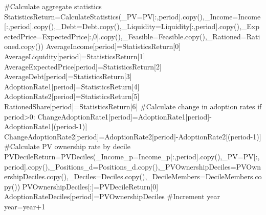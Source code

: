 \documentclass[
  letterpaper,
  DIV=11,
  numbers=noendperiod]{scrartcl}
\newenvironment{Shaded}{\begin{snugshade}}{\end{snugshade}}
\newcommand{\CommentTok}[1]{\textcolor[rgb]{0.37,0.37,0.37}{#1}}
\newcommand{\ControlFlowTok}[1]{\textcolor[rgb]{0.00,0.23,0.31}{#1}}
\newcommand{\DecValTok}[1]{\textcolor[rgb]{0.68,0.00,0.00}{#1}}
\newcommand{\NormalTok}[1]{\textcolor[rgb]{0.00,0.23,0.31}{#1}}
\newcommand{\OperatorTok}[1]{\textcolor[rgb]{0.37,0.37,0.37}{#1}}
\begin{document}
\begin{Shaded}
\begin{Highlighting}[]
        \CommentTok{\#Calculate aggregate statistics}
\NormalTok{        StatisticsReturn}\OperatorTok{=}\NormalTok{CalculateStatistics(\_PV}\OperatorTok{=}\NormalTok{PV[:,period].copy(),\_Income}\OperatorTok{=}\NormalTok{Income[:,period].copy(),\_Debt}\OperatorTok{=}\NormalTok{Debt.copy(),\_Liquidity}\OperatorTok{=}\NormalTok{Liquidity[:,period].copy(),\_ExpectedPrice}\OperatorTok{=}\NormalTok{ExpectedPrice[:,}\DecValTok{0}\NormalTok{].copy(),\_Feasible}\OperatorTok{=}\NormalTok{Feasible.copy(),\_Rationed}\OperatorTok{=}\NormalTok{Rationed.copy())}
\NormalTok{        AverageIncome[period]}\OperatorTok{=}\NormalTok{StatisticsReturn[}\DecValTok{0}\NormalTok{]}
\NormalTok{        AverageLiquidity[period]}\OperatorTok{=}\NormalTok{StatisticsReturn[}\DecValTok{1}\NormalTok{]}
\NormalTok{        AverageExpectedPrice[period]}\OperatorTok{=}\NormalTok{StatisticsReturn[}\DecValTok{2}\NormalTok{]}
\NormalTok{        AverageDebt[period]}\OperatorTok{=}\NormalTok{StatisticsReturn[}\DecValTok{3}\NormalTok{]}
\NormalTok{        AdoptionRate1[period]}\OperatorTok{=}\NormalTok{StatisticsReturn[}\DecValTok{4}\NormalTok{]}
\NormalTok{        AdoptionRate2[period]}\OperatorTok{=}\NormalTok{StatisticsReturn[}\DecValTok{5}\NormalTok{]}
\NormalTok{        RationedShare[period]}\OperatorTok{=}\NormalTok{StatisticsReturn[}\DecValTok{6}\NormalTok{]}
        \CommentTok{\#Calculate change in adoption rates}
        \ControlFlowTok{if}\NormalTok{ period}\OperatorTok{\textgreater{}}\DecValTok{0}\NormalTok{:}
\NormalTok{            ChangeAdoptionRate1[period]}\OperatorTok{=}\NormalTok{AdoptionRate1[period]}\OperatorTok{{-}}\NormalTok{AdoptionRate1[(period}\OperatorTok{{-}}\DecValTok{1}\NormalTok{)]}
\NormalTok{            ChangeAdoptionRate2[period]}\OperatorTok{=}\NormalTok{AdoptionRate2[period]}\OperatorTok{{-}}\NormalTok{AdoptionRate2[(period}\OperatorTok{{-}}\DecValTok{1}\NormalTok{)]}
        \CommentTok{\#Calculate PV ownership rate by decile    }
\NormalTok{        PVDecileReturn}\OperatorTok{=}\NormalTok{PVDeciles(\_Income\_p}\OperatorTok{=}\NormalTok{Income\_p[:,period].copy(),\_PV}\OperatorTok{=}\NormalTok{PV[:,period].copy(),\_Positions\_d}\OperatorTok{=}\NormalTok{Positions\_d.copy(),\_PVOwnershipDeciles}\OperatorTok{=}\NormalTok{PVOwnershipDeciles.copy(),\_Deciles}\OperatorTok{=}\NormalTok{Deciles.copy(),\_DecileMembers}\OperatorTok{=}\NormalTok{DecileMembers.copy())}
\NormalTok{        PVOwnershipDeciles[:]}\OperatorTok{=}\NormalTok{PVDecileReturn[}\DecValTok{0}\NormalTok{]}
\NormalTok{        AdoptionRateDeciles[period]}\OperatorTok{=}\NormalTok{PVOwnershipDeciles}
        \CommentTok{\#Increment year}
\NormalTok{        year}\OperatorTok{=}\NormalTok{year}\OperatorTok{+}\DecValTok{1}


\end{Highlighting}
\end{Shaded}
\end{document}
